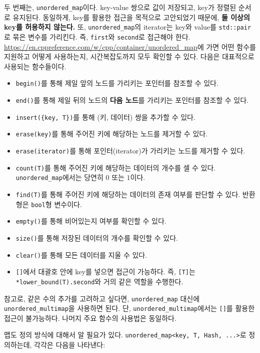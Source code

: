 두 번째는, \texttt{unordered\_map}이다. key-value 쌍으로 값이 저장되고, key가 정렬된 순서로 유지된다. 동일하게, key를 활용한 접근을 목적으로 고안되었기 때문에, \textbf{둘 이상의 key를 허용하지 않는다.} 또, \texttt{unordered\_map}의 iterator는 key와 value를 \texttt{std::pair}로 묶은 변수를 가리킨다. 즉, \texttt{first}와 \texttt{second}로 접근해야 한다. \url{https://en.cppreference.com/w/cpp/container/unordered\_map}에 가면 어떤 함수를 지원하고 어떻게 사용하는지, 시간복잡도까지 모두 확인할 수 있다. 다음은 대표적으로 사용되는 함수들이다.

\begin{itemize}
    \item \texttt{begin()}를 통해 제일 앞의 노드를 가리키는 포인터를 참조할 수 있다.
    \item \texttt{end()}를 통해 제일 뒤의 노드의 \textbf{다음 노드}를 가리키는 포인터를 참조할 수 있다.
    \item \texttt{insert(\{key, T\})}를 통해 (키, 데이터) 쌍을 추가할 수 있다.
    \item \texttt{erase(key)}를 통해 주어진 키에 해당하는 노드를 제거할 수 있다.
    \item \texttt{erase(iterator)}를 통해 포인터(iterator)가 가리키는 노드를 제거할 수 있다.
    \item \texttt{count(T)}를 통해 주어진 키에 해당하는 데이터의 개수를 셀 수 있다. \texttt{unordered\_map}에서는 당연히 $0$ 또는 $1$이다.
    \item \texttt{find(T)}를 통해 주어진 키에 해당하는 데이터의 존재 여부를 판단할 수 있다. 반환형은 \texttt{bool}형 변수이다.
    \item \texttt{empty()}를 통해 비어있는지 여부를 확인할 수 있다.
    \item \texttt{size()}를 통해 저장된 데이터의 개수를 확인할 수 있다.
    \item \texttt{clear()}를 통해 모든 데이터를 지울 수 있다.
    \item \texttt{[]}에서 대괄호 안에 key를 넣으면 접근이 가능하다. 즉, \texttt{[T]}는 \texttt{*lower\_bound(T).second}와 거의 같은 역할을 수행한다.
\end{itemize}

참고로, 같은 수의 추가를 고려하고 싶다면, \texttt{unordered\_map} 대신에 \texttt{unordered\_multimap}을 사용하면 된다. 단, \texttt{unordered\_multimap}에서는 \texttt{[]}를 활용한 접근이 불가능하다. 나머지 주요 함수의 사용법은 동일하다.

맵도 정의 방식에 대해서 알 필요가 있다. \texttt{unordered\_map<key, T, Hash, ...>}로 정의하는데, 각각은 다음을 나타낸다:

